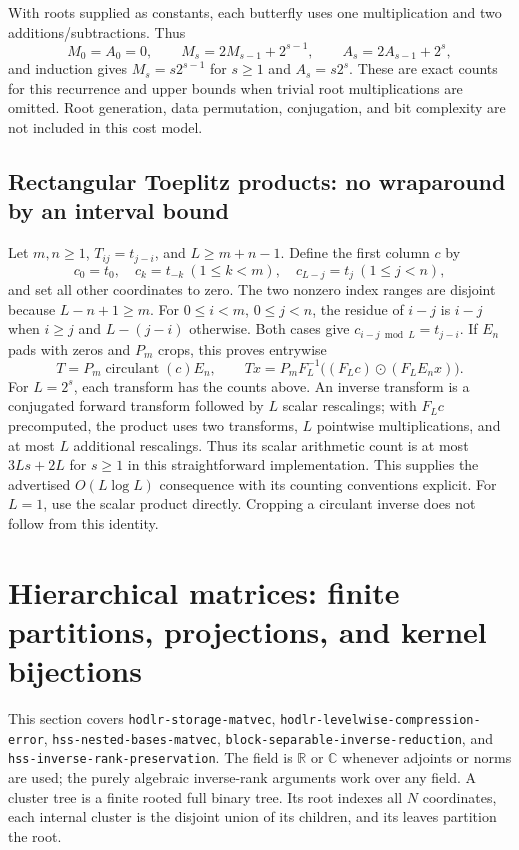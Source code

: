 \documentclass[11pt,a4paper]{article}
\newcommand{\R}{\mathbb R}
\newcommand{\C}{\mathbb C}
\DeclareRobustCommand{\code}[1]{{\footnotesize\urlstyle{tt}\nolinkurl{#1}}}
\begin{document}
With roots supplied as constants, each butterfly uses one multiplication
and two additions/subtractions. Thus
\[
 M_0=A_0=0,\qquad M_s=2M_{s-1}+2^{s-1},
 \qquad A_s=2A_{s-1}+2^s,
\]
and induction gives $M_s=s2^{s-1}$ for $s\ge1$ and $A_s=s2^s$.
These are exact counts for this recurrence and upper bounds when trivial
root multiplications are omitted. Root generation, data permutation,
conjugation, and bit complexity are not included in this cost model.

\subsection{Rectangular Toeplitz products: no wraparound by an interval bound}

Let $m,n\ge1$, $T_{ij}=t_{j-i}$, and $L\ge m+n-1$. Define the
first column $c$ by
\[
 c_0=t_0,\quad c_k=t_{-k}\ (1\le k<m),\quad
 c_{L-j}=t_j\ (1\le j<n),
\]
and set all other coordinates to zero. The two nonzero index ranges are
disjoint because $L-n+1\ge m$. For $0\le i<m$, $0\le j<n$,
the residue of $i-j$ is $i-j$ when $i\ge j$ and $L-(j-i)$ otherwise.
Both cases give $c_{i-j\bmod L}=t_{j-i}$. If $E_n$ pads with zeros and
$P_m$ crops, this proves entrywise
\[
 T=P_m\operatorname{circulant}(c)E_n,\qquad
 Tx=P_mF_L^{-1}\big((F_Lc)\odot(F_LE_nx)\big).
\]
For $L=2^s$, each transform has the counts above. An inverse transform
is a conjugated forward transform followed by $L$ scalar rescalings;
with $F_Lc$ precomputed, the product uses two transforms, $L$ pointwise
multiplications, and at most $L$ additional rescalings. Thus its scalar
arithmetic count is at most $3Ls+2L$ for $s\ge1$ in this straightforward
implementation. This supplies the advertised $O(L\log L)$ consequence
with its counting conventions explicit. For $L=1$, use the scalar product
directly. Cropping a circulant inverse does not follow from this identity.

\section{Hierarchical matrices: finite partitions, projections, and kernel bijections}
\label{sec:ns-hierarchical}

This section covers \code{hodlr-storage-matvec},
\code{hodlr-levelwise-compression-error},
\code{hss-nested-bases-matvec},
\code{block-separable-inverse-reduction}, and
\code{hss-inverse-rank-preservation}. The field is $\R$ or $\C$ whenever
adjoints or norms are used; the purely algebraic inverse-rank arguments
work over any field. A cluster tree is a finite rooted full binary tree.
Its root indexes all $N$ coordinates, each internal cluster is the
disjoint union of its children, and its leaves partition the root.
\end{document}
